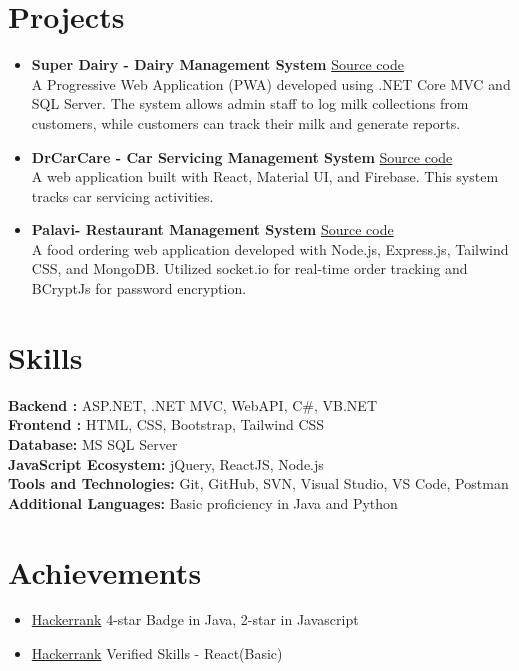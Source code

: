 \documentclass[letterpaper,11pt]{article}
\begin{document}
\section*{Projects}
\begin{itemize}[leftmargin=*]
    \item \textbf{Super Dairy - Dairy Management System} \href{https://github.com/Dev-Trilok/SuperDairy}{Source code} \\
    A Progressive Web Application (PWA) developed using .NET Core MVC and SQL Server. The system allows admin staff to log milk collections from customers, while customers can track their milk and generate reports.

    \item \textbf{DrCarCare - Car Servicing Management System} \href{https://github.com/Dev-Trilok/DrCarCare-Admin-Dashboard}{Source code} \\
    A web application built with React, Material UI, and Firebase. This system tracks car servicing activities.

    \item \textbf{Palavi- Restaurant Management System} \href{https://github.com/Dev-Trilok/Palavi-Online-Resto}{Source code} \\
    A food ordering web application developed with Node.js, Express.js, Tailwind CSS, and MongoDB. Utilized socket.io for real-time order tracking and BCryptJs for password encryption.
\end{itemize}

\section*{Skills}
\begin{itemize}[leftmargin=*]
     \textbf{Backend :} ASP.NET, .NET MVC, WebAPI, C\#, VB.NET \\
    \textbf{Frontend :} HTML, CSS, Bootstrap, Tailwind CSS \\
    \textbf{Database:} MS SQL Server \\
    \textbf{JavaScript Ecosystem:} jQuery, ReactJS, Node.js \\
    \textbf{Tools and Technologies:} Git, GitHub, SVN, Visual Studio, VS Code, Postman \\
    \textbf{Additional Languages:} Basic proficiency in Java and Python
\end{itemize}




\section*{Achievements}
\begin{multicols}{2}
\begin{itemize}[leftmargin=*]
    \item \href{https://www.hackerrank.com/profile/trilokmhl}{Hackerrank} 4-star Badge in Java, 2-star in Javascript
    \item \href{https://www.hackerrank.com/profile/trilokmhl}{Hackerrank} Verified Skills - React(Basic)
\end{itemize}
\end{multicols}
\end{document}
